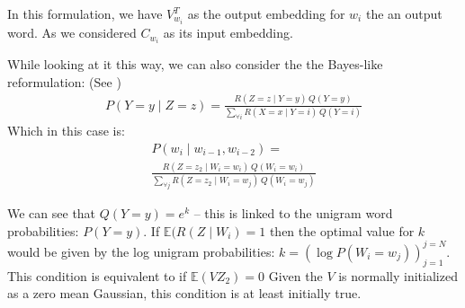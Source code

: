 \documentclass[parskip]{komatufte}
\begin{document}

In this formulation, we have $V_{w_{i}}^{T}$ as the output embedding for $w_{i}$ the an output word.
As we considered  $C_{w_{i}}$ as its input embedding.

While looking at it this way, we can also consider the the Bayes-like reformulation: (See )
\begin{multline}
P(Y=y\mid Z=z)=\frac{R(Z=z\mid Y=y)\,Q(Y=y)}{\sum_{\forall i}R(X=x\mid Y=i)\,Q(Y=i)}
\end{multline}
Which in this case is:
\begin{multline}
P(w_{i}\mid w_{i-1},w_{i-2})=\\
\frac{R(Z=z_{2}\mid W_{i}=w_{i})\,Q(W_{i}=w_{i})}{\sum_{\forall j}R(Z=z_{2}\mid W_{i}=w_{j})\,Q(W_{i}=w_{j})}
\end{multline}

We can see that $Q(Y=y)=e^{k}$ -- this is linked to the unigram word probabilities: $P(Y=y)$.
If $\mathbb{E}(R(Z\mid W_{i})=1$ then the optimal value for $k$ would be given by the log unigram probabilities: $k=\left(\log P(W_{i}=w_{j})\right)_{j=1}^{j=N}$.
This condition is equivalent to if $\mathbb{E}(VZ_{2})=0$
Given the $V$ is normally initialized as a zero mean Gaussian, this condition is at least initially true.
\end{document}
